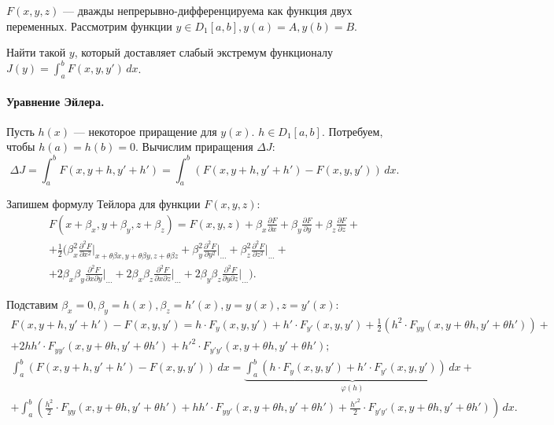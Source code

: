 
$F(x, y, z)$ --- дважды непрерывно-дифференцируема как функция двух переменных. Рассмотрим функции $y \in D_1[a, b], y(a) = A, y(b) = B$. 

Найти такой $y$, который доставляет слабый экстремум функционалу $J(y) = \int_{a}^{b} F(x, y, y') \, dx$. 

\paragraph{Уравнение Эйлера.}
Пусть $h(x)$ --- некоторое приращение для $y(x)$. $h \in D_1[a, b]$. Потребуем, чтобы $h(a) = h(b) = 0$. Вычислим приращения $\Delta J$:
\begin{equation*}
	\Delta J = \int_{a}^{b} F(x, y + h, y' + h') = \int_{a}^{b} (F(x, y + h, y' + h') - F(x, y, y')) \, dx.
\end{equation*}

Запишем формулу Тейлора для функции $F(x, y, z)$: 
\begin{gather*}
	F(x + \beta_x, y + \beta_y, z + \beta_z) = F(x, y, z) + \beta_x \frac{\partial F}{\partial x} + \beta_y \frac{\partial F}{\partial y} + \beta_z \frac{\partial F}{\partial z} +  \\
	+ \frac{1}{2} \Big(\beta_x^2 \frac{\partial^2 F}{\partial x^2} \Big|_{x + \theta \beta x, y + \theta \beta y, z + \theta \beta z} + \beta_y^2 \frac{\partial^2 F}{\partial y^2} \Big|_{\dotsc} + \beta_z^2 \frac{\partial^2 F}{\partial z^2} \Big|_{\dotsc} + \\ 
	+ 2 \beta_x \beta_y \frac{\partial^2 F}{\partial x \partial y} \Big|_{\dotsc} + 2 \beta_x \beta_z \frac{\partial^2 F}{\partial x \partial z} \Big|_{\dotsc} + 2 \beta_y \beta_z \frac{\partial^2 F}{\partial y \partial z} \Big|_{\dotsc}\Big).
\end{gather*}

Подставим $\beta_x = 0, \beta_y = h(x), \beta_z = h'(x), y = y(x), z = y'(x):$
\begin{gather*}
	F(x, y + h, y' + h') - F(x, y, y') = h \cdot F_y(x, y, y') + h' \cdot F_{y'}(x, y, y') + \frac{1}{2} (h^2 \cdot F_{y y}(x, y + \theta h, y' + \theta h')) + \\
	+ 2 h h' \cdot F_{y y'}(x, y + \theta h, y' + \theta h') + h'^2 \cdot F_{y'y'}(x, y + \theta h, y' + \theta h'); \\
	\int_{a}^{b} (F(x, y + h, y' + h') - F(x, y, y')) \, dx =
  \underbrace{\int_{a}^{b} (h \cdot F_y(x, y, y') + h' \cdot F_{y'}(x, y, y')) \, dx}_{\varphi(h)} + \\
	+ \int_{a}^{b} \left(\frac{h^2}{2} \cdot F_{y y}(x, y + \theta h, y' + \theta h') + h h' \cdot F_{y y'}(x, y + \theta h, y' + \theta h') + \frac{h'^2}{2} \cdot F_{y' y'} (x, y + \theta h, y' + \theta h')\right) \, dx.
\end{gather*}

